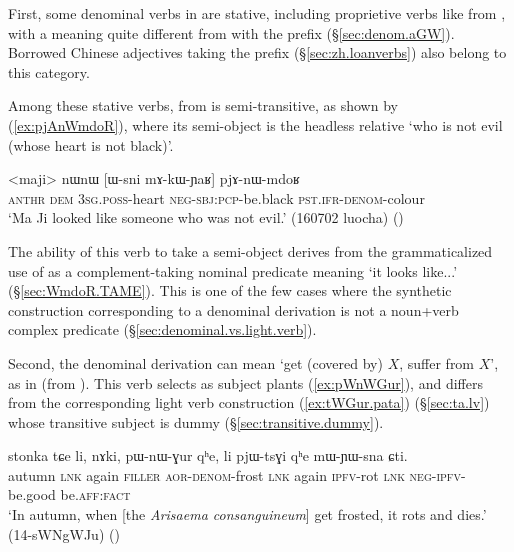 First, some denominal verbs in  are stative, including proprietive verbs like   from , with a meaning quite different from  with the  prefix (§\ref{sec:denom.aGW}).  Borrowed Chinese adjectives taking the  prefix (§\ref{sec:zh.loanverbs}) also belong to this category.
 
Among these stative verbs,   from   is semi-transitive, as shown by (\ref{ex:pjAnWmdoR}), where its semi-object is the headless relative  `who is not evil (whose heart is not black)'.  
  
\begin{exe}
\ex \label{ex:pjAnWmdoR}
 \gll <maji> nɯnɯ [ɯ-sni mɤ-kɯ-ɲaʁ] pjɤ-nɯ-mdoʁ  \\
  \textsc{anthr} \textsc{dem} \textsc{3sg}.\textsc{poss}-heart \textsc{neg}-\textsc{sbj}:\textsc{pcp}-be.black \textsc{pst}.\textsc{ifr}-\textsc{denom}-colour \\
 \glt `Ma Ji looked like someone who was not evil.' (160702 luocha) ()
\end{exe}

The ability of this verb to take a semi-object derives from the grammaticalized use of  as a com\-ple\-ment-taking nominal predicate meaning `it looks like...' (§\ref{sec:WmdoR.TAME}). This is one of the few cases where the synthetic construction corresponding to a denominal derivation is not a noun+verb complex predicate (§\ref{sec:denominal.vs.light.verb}).

 
 
Second, the  denominal derivation can mean `get (covered by) $X$, suffer from $X$', as in  (from ). This verb selects as subject plants (\ref{ex:pWnWGur}), and differs from the corresponding light verb construction  (\ref{ex:tWGur.pata}) (§\ref{sec:ta.lv}) whose transitive subject is dummy (§\ref{sec:transitive.dummy}).
 
 
 \begin{exe}
\ex \label{ex:pWnWGur}
 \gll stonka tɕe li, nɤki, pɯ-nɯ-ɣur qʰe, li pjɯ-tsɣi qʰe mɯ-ɲɯ-sna ɕti. \\
autumn \textsc{lnk} again \textsc{filler} \textsc{aor}-\textsc{denom}-frost \textsc{lnk} again \textsc{ipfv}-rot \textsc{lnk} \textsc{neg}-\textsc{ipfv}-be.good be.\textsc{aff}:\textsc{fact} \\
\glt `In autumn, when [the \textit{Arisaema consanguineum}] get frosted, it rots and dies.' (14-sWNgWJu)
()
\end{exe}


